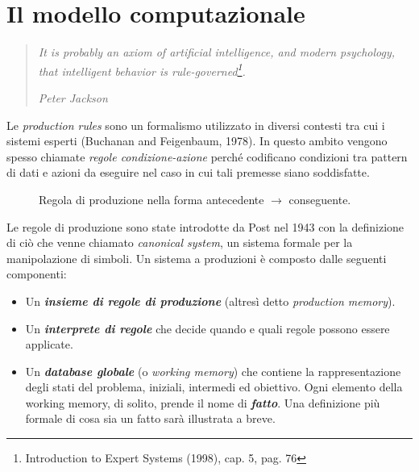 \section{Il modello computazionale}

\begin{quotation}
\noindent \em It is probably an axiom of artificial intelligence, and modern psychology, that intelligent behavior is rule-governed\footnote{Introduction to Expert Systems (1998), cap. 5, pag. 76}.

\em Peter Jackson
\end{quotation}


Le \emph{production rules} sono un formalismo utilizzato in diversi contesti tra cui i sistemi esperti (Buchanan and Feigenbaum, 1978). In questo ambito vengono spesso chiamate \emph{regole condizione-azione} perché codificano condizioni tra pattern di dati e azioni da eseguire nel caso in cui tali premesse siano soddisfatte.
\begin{figure}
  \caption{Regola di produzione nella forma antecedente $\longrightarrow$ conseguente.}
\end{figure}

Le regole di produzione sono state introdotte da Post nel 1943 con la definizione di ciò che venne chiamato \emph{canonical system}, un sistema formale per la manipolazione di simboli. 
Un sistema a produzioni è composto dalle seguenti componenti:
\begin{itemize}
  \item Un \textbf{\emph{insieme di regole di produzione}} (altresì detto \emph{production memory}).
  \item Un \textbf{\emph{interprete di regole}} che decide quando e quali regole possono essere applicate.
  \item Un \textbf{\emph{database globale}} (o \emph{working memory}) che contiene la rappresentazione degli stati del problema, iniziali, intermedi ed obiettivo. Ogni elemento della working memory, di solito, prende il nome di \textbf{\emph{fatto}}. Una definizione più formale di cosa sia un fatto sarà illustrata a breve.
\end{itemize}

